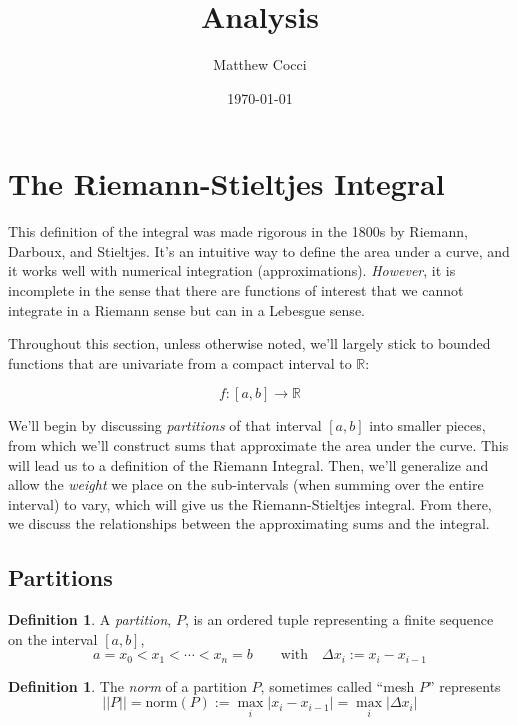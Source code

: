 \documentclass[12pt]{article}
\author{Matthew Cocci}
\title{\textbf{Analysis}}
\date{\today}
\theoremstyle{plain}
\theoremstyle{definition}
\newtheorem{defn}[thm]{Definition}
\theoremstyle{remark}
\begin{document}
\maketitle

\tableofcontents %

\newpage
\section{The Riemann-Stieltjes Integral}

This definition of the integral was made rigorous in the 1800s by Riemann, Darboux, and Stieltjes.  It's an intuitive way to define the area under a curve, and it works well with numerical integration (approximations). \emph{However}, it is incomplete in the sense that there are functions of interest that we cannot integrate in a Riemann sense but can in a Lebesgue sense. 

Throughout this section, unless otherwise noted, we'll largely stick to bounded functions that are univariate from a compact interval to $\mathbb{R}$: 

    \[ f: [a, b] \rightarrow \mathbb{R} \]

    We'll begin by discussing \emph{partitions} of that interval $[a,b]$ into smaller pieces, from which we'll construct sums that approximate the area under the curve.  This will lead us to a definition of the Riemann Integral.  Then, we'll generalize and allow the \emph{weight} we place on the sub-intervals (when summing over the entire interval) to vary, which will give us the Riemann-Stieltjes integral. From there, we discuss the relationships between the approximating sums and the integral.

\subsection{Partitions}

\begin{defn} A \emph{partition}, $P$, is an ordered tuple representing a finite sequence on the interval $[a,b]$,
    \[ a = x_0 < x_1 < \cdots < x_n = b
        \qquad \text{with} \quad \Delta x_i := x_i - x_{i-1}
    \]
\end{defn}

\begin{defn} The \emph{norm} of a partition $P$, sometimes called ``mesh $P$'' represents
    \[ || P || = \text{norm}(P) := \max_i |x_i - x_{i-1}| =
        \max_i |\Delta x_i| \] 
\end{defn}
\end{document}
